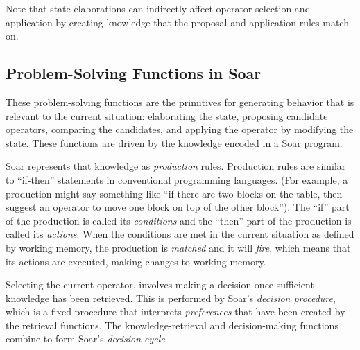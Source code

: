 Note that state elaborations can indirectly affect operator selection
and application by creating knowledge that the proposal and application
rules match on.

\subsection{Problem-Solving Functions in Soar}
\label{ARCH-functions}

These problem-solving functions are the primitives for generating 
behavior that is relevant to the current situation: elaborating the 
state, proposing candidate operators, comparing the candidates, 
and applying the operator by modifying the state. 
These functions are driven by the knowledge encoded in a Soar program.

Soar represents that knowledge as \textit{production} rules.  
Production rules are similar to ``if-then'' statements in conventional 
programming languages. (For example, a
production might say something like ``if there are two blocks on the
table, then suggest an operator to move one block on top of the other
block'').  The ``if'' part of the production is called its
\textit{conditions} and the ``then'' part of the production is called
its \textit{actions}. When the conditions are met in the current
situation as defined by working memory, the production is \emph{matched}
and it will \emph{fire}, which means that its actions are executed,
making changes to working memory. 

Selecting the current operator, involves making a
decision once sufficient knowledge has been retrieved.  This is
performed by Soar's \emph{decision procedure}, which is a fixed
procedure that interprets \emph{preferences} that have been created by
the retrieval functions. The knowledge-retrieval and decision-making
functions combine to form Soar's \emph{decision cycle}.



